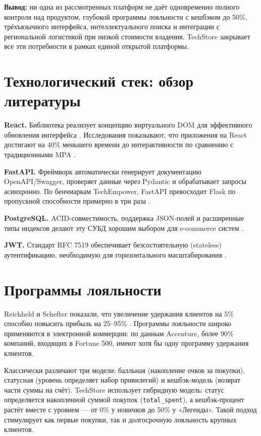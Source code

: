 \documentclass[14pt,a4paper]{extreport}
\begin{document}
\textbf{Вывод:} ни одна из рассмотренных платформ не даёт одновременно полного контроля над продуктом, глубокой программы лояльности с кешбэком до 50\%, трёхъязычного интерфейса, интеллектуального поиска и интеграции с региональной логистикой при низкой стоимости владения. TechStore закрывает все эти потребности в рамках единой открытой платформы.

\section{Технологический стек: обзор литературы}

\textbf{React.} Библиотека реализует концепцию виртуального DOM для эффективного обновления интерфейса \cite{react2024}. Исследования показывают, что приложения на React достигают на 40\% меньшего времени до интерактивности по сравнению с традиционными MPA \cite{garrett2022}.

\textbf{FastAPI.} Фреймворк автоматически генерирует документацию OpenAPI/Swagger, проверяет данные через Pydantic и обрабатывает запросы асинхронно. По бенчмаркам TechEmpower, FastAPI превосходит Flask по пропускной способности примерно в три раза \cite{fastapi2024}.

\textbf{PostgreSQL.} ACID-совместимость, поддержка JSON-полей и расширенные типы индексов делают эту СУБД хорошим выбором для e-commerce систем \cite{postgresql2024}.

\textbf{JWT.} Стандарт RFC 7519 обеспечивает безсостоятельную (stateless) аутентификацию, необходимую для горизонтального масштабирования \cite{rfc7519}.

\section{Программы лояльности}

Reichheld и Schefter показали, что увеличение удержания клиентов на 5\% способно повысить прибыль на 25--95\% \cite{reichheld2000}. Программы лояльности широко применяются в электронной коммерции: по данным Accenture, более 90\% компаний, входящих в Fortune 500, имеют хотя бы одну программу удержания клиентов.

Классически различают три модели: балльная (накопление очков за покупки), статусная (уровень определяет набор привилегий) и кешбэк-модель (возврат части суммы на счёт). TechStore использует гибридную модель: статус определяется накопленной суммой покупок (\texttt{total\_spent}), а кешбэк-процент растёт вместе с уровнем — от 0\% у новичков до 50\% у «Легенды». Такой подход стимулирует как первые покупки, так и долгосрочную лояльность крупных клиентов.
\end{document}
